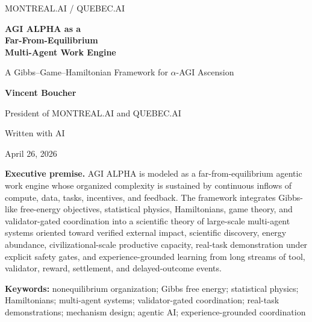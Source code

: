 \documentclass[11pt]{article}
\begin{document}
\begin{titlepage}
\thispagestyle{empty}
\pagecolor{AgiMist}
\vspace*{0.7cm}
\begin{center}
\begin{tcolorbox}[enhanced,width=0.86\textwidth,colback=white,colframe=AgiLine,boxrule=0.55pt,arc=3pt,left=8pt,right=8pt,top=8pt,bottom=8pt]
\centering\Large\textsc{MONTREAL.AI / QUEBEC.AI}
\end{tcolorbox}
\vspace{1.05cm}
\begin{tcolorbox}[enhanced,width=0.92\textwidth,colback=white,colframe=AgiBlue!45,boxrule=0.6pt,arc=4pt,left=12pt,right=12pt,top=12pt,bottom=12pt]
\centering
{\fontsize{29}{34}\selectfont\bfseries\color{AgiBlue} AGI ALPHA as a\\[0.18em] Far-From-Equilibrium\\[0.18em] Multi-Agent Work Engine\par}
\vspace{0.45cm}
{\Large A Gibbs--Game--Hamiltonian Framework for $\alpha$-AGI Ascension\par}
\end{tcolorbox}
\vspace{0.8cm}
{\Large\bfseries Vincent Boucher\par}
\vspace{0.12cm}
{\normalsize President of MONTREAL.AI and QUEBEC.AI\par}
{\normalsize Written with AI\par}
\vspace{0.12cm}
{\normalsize April 26, 2026\par}
\vspace{0.75cm}
\begin{executivebox}
\textbf{Executive premise.} AGI ALPHA is modeled as a far-from-equilibrium agentic work engine whose organized complexity is sustained by continuous inflows of compute, data, tasks, incentives, and feedback. The framework integrates Gibbs-like free-energy objectives, statistical physics, Hamiltonians, game theory, and validator-gated coordination into a scientific theory of large-scale multi-agent systems oriented toward verified external impact, scientific discovery, energy abundance, civilizational-scale productive capacity, real-task demonstration under explicit safety gates, and experience-grounded learning from long streams of tool, validator, reward, settlement, and delayed-outcome events.
\end{executivebox}
\vfill
\begin{goldbox}
\centering\small\textbf{Keywords:} nonequilibrium organization; Gibbs free energy; statistical physics; Hamiltonians; multi-agent systems; validator-gated coordination; real-task demonstrations; mechanism design; agentic AI; experience-grounded coordination
\end{goldbox}
\end{center}
\end{titlepage}
\end{document}
